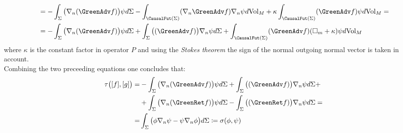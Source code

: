\documentclass[Main]{subfiles}
\begin{document}
\begin{example}
\begin{align}
			&= -\int_\Sigma \big( \nabla_n ( \GreenAdv f) \big) \psi d\Sigma 
				- \int_{\CausalFut(\Sigma)} (\nabla_n \GreenAdv f) \nabla_n \psi d\textrm{Vol}_M 
				+ \kappa \int_{\CausalFut(\Sigma)} ( \GreenAdv f) \psi d\textrm{Vol}_M  =\nonumber\\
			&= -\int_\Sigma \big( \nabla_n ( \GreenAdv f) \big) \psi d\Sigma 	+\int_\Sigma \big( ( \GreenAdv f) \big)\nabla_n  \psi d\Sigma  + \int_{\CausalFut(\Sigma)} ( \GreenAdv f) ( \square_m + \kappa) \psi d\textrm{Vol}_M
		\end{align}
		where $\kappa$ is the constant factor in operator $P$ and using the \emph{Stokes theorem}  the sign of the normal outgoing normal vector is taken in account.\\
		Combining the two preceeding equations one concludes that:
		\begin{align}
		\tau\big( [f], [g] \big) =&  -\int_\Sigma \big( \nabla_n ( \GreenAdv f) \big) \psi d\Sigma
		+\int_\Sigma \big( ( \GreenAdv f) \big)\nabla_n  \psi d\Sigma +\nonumber\\
		&+\int_\Sigma \big( \nabla_n ( \GreenRet f) \big) \psi d\Sigma  
		-\int_\Sigma \big( ( \GreenRet f) \big)\nabla_n  \psi d\Sigma =  \nonumber\\
		=& \int_\Sigma \big( \phi \nabla_n \psi - \psi \nabla_n \phi \big) d\Sigma \coloneqq\sigma (\phi, \psi)
		\end{align}
		
	\end{example}
\end{document}
